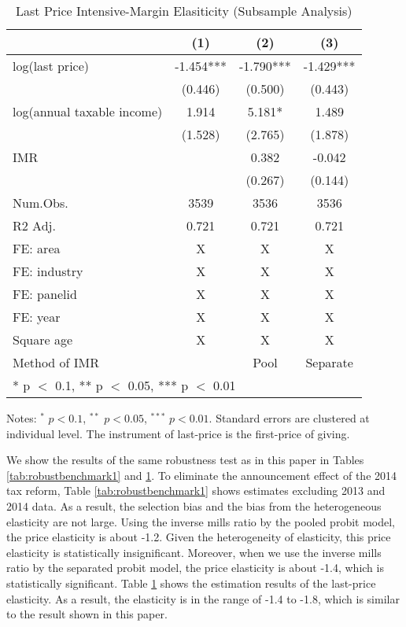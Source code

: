 \documentclass[
  11pt,
  a4paper,
]{article}
\begin{document}
\begin{table}

\caption{\label{tab:robustbenchmark2}Last Price Intensive-Margin Elasiticity (Subsample Analysis)}
\centering
\fontsize{9}{11}\selectfont
\begin{threeparttable}
\begin{tabular}[t]{lccc}
\toprule
  & (1) & (2) & (3)\\
\midrule
log(last price) & -1.454*** & -1.790*** & -1.429***\\
 & (0.446) & (0.500) & (0.443)\\
log(annual taxable income) & 1.914 & 5.181* & 1.489\\
 & (1.528) & (2.765) & (1.878)\\
IMR &  & 0.382 & -0.042\\
 &  & (0.267) & (0.144)\\
\midrule
Num.Obs. & 3539 & 3536 & 3536\\
R2 Adj. & 0.721 & 0.721 & 0.721\\
FE: area & X & X & X\\
FE: industry & X & X & X\\
FE: panelid & X & X & X\\
FE: year & X & X & X\\
Square age & X & X & X\\
Method of IMR &  & Pool & Separate\\
\bottomrule
\multicolumn{4}{l}{\rule{0pt}{1em}* p $<$ 0.1, ** p $<$ 0.05, *** p $<$ 0.01}\\
\end{tabular}
\begin{tablenotes}
\item Notes: $^{*}$ $p < 0.1$, $^{**}$ $p < 0.05$, $^{***}$ $p < 0.01$. Standard errors are clustered at individual level. The instrument of last-price is the first-price of giving.
\end{tablenotes}
\end{threeparttable}
\end{table}

We show the results of the same robustness test as in this paper
in Tables \ref{tab:robustbenchmark1} and \ref{tab:robustbenchmark2}.
To eliminate the announcement effect of the 2014 tax reform,
Table \ref{tab:robustbenchmark1} shows
estimates excluding 2013 and 2014 data.
As a result, the selection bias and
the bias from the heterogeneous elasticity are not large.
Using the inverse mills ratio by the pooled probit model,
the price elasticity is about -1.2.
Given the heterogeneity of elasticity,
this price elasticity is statistically insignificant.
Moreover,
when we use the inverse mills ratio by the separated probit model,
the price elasticity is about -1.4, which is statistically significant.
Table \ref{tab:robustbenchmark2} shows
the estimation results of the last-price elasticity.
As a result, the elasticity is in the range of -1.4 to -1.8,
which is similar to the result shown in this paper.
\end{document}

